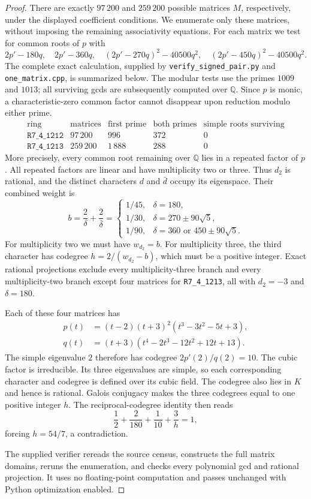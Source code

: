 \begin{proof}
There are exactly $97\,200$ and $259\,200$ possible matrices $M$,
respectively, under the displayed coefficient conditions. We enumerate
only these matrices, without imposing the remaining associativity
equations. For each matrix we test for common roots of $p$ with
\[
 2p'-180q,\quad 2p'-360q,\quad
 (2p'-270q)^2-40500q^2,\quad
 (2p'-450q)^2-40500q^2.
\]
The complete exact calculation, supplied by
\texttt{verify\_signed\_pair.py} and \texttt{one\_matrix.cpp}, is
summarized below. The modular tests use the primes $1009$ and $1013$;
all surviving gcds are subsequently computed over $\mathbb Q$.
Since $p$ is monic, a characteristic-zero common factor cannot disappear
upon reduction modulo either prime.
\[
\begin{array}{c|r|r|r|r}
 \text{ring}&\text{matrices}&\text{first prime}&\text{both primes}
 &\text{simple roots surviving}\\ \hline
 \texttt{R7\_4\_1212}&97\,200&996&372&0\\
 \texttt{R7\_4\_1213}&259\,200&1\,888&288&0
\end{array}
\]
More precisely, every common root remaining over $\mathbb Q$ lies in a
repeated factor of $p$. All repeated factors are linear and have
multiplicity two or three. Thus $d_2$ is rational, and the distinct
characters $d$ and $\bar d$ occupy its eigenspace. Their combined weight is
\[
 b=\frac2\delta+\frac2{\bar\delta}
 =\begin{cases}
  1/45,&\delta=180,\\
  1/30,&\delta=270\pm90\sqrt5,\\
  1/90,&\delta=360\text{ or }450\pm90\sqrt5.
 \end{cases}
\]
For multiplicity two we must have $w_{d_2}=b$. For multiplicity three,
the third character has codegree $h=2/(w_{d_2}-b)$, which must be a
positive integer. Exact rational projections exclude every
multiplicity-three branch and every multiplicity-two branch except
four matrices for \texttt{R7\_4\_1213}, all with $d_2=-3$ and
$\delta=180$.

Each of these four matrices has
\[
 \begin{split}
 p(t)&=(t-2)(t+3)^2(t^3-3t^2-5t+3),\\
 q(t)&=(t+3)(t^4-2t^3-12t^2+12t+13).
 \end{split}
\]
The simple eigenvalue $2$ therefore has codegree $2p'(2)/q(2)=10$.
The cubic factor is irreducible. Its three eigenvalues are simple, so
each corresponding character and codegree is defined over its cubic
field. The codegree also lies in $K$ and hence is rational. Galois
conjugacy makes the three codegrees equal to one positive integer $h$.
The reciprocal-codegree identity then reads
\[
 \frac12+\frac2{180}+\frac1{10}+\frac3h=1,
\]
forcing $h=54/7$, a contradiction.

The supplied verifier rereads the source census, constructs the full
matrix domains, reruns the enumeration, and checks every polynomial gcd
and rational projection. It uses no floating-point computation and
passes unchanged with Python optimization enabled.
\end{proof}

